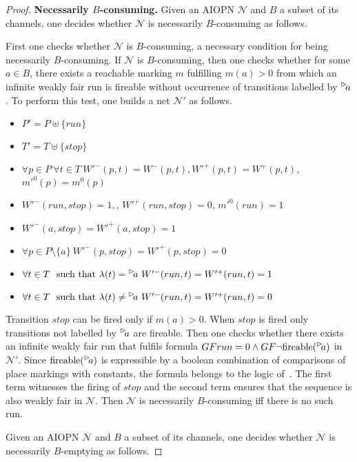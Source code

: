 \begin{proof}
	{\bf Necessarily $B$-consuming.}
Given an AIOPN $\mathcal N$ and $B$ a subset of its channels, one
decides whether $\mathcal N$ is necessarily $B$-consuming as follows.

\noindent First one checks whether $\mathcal N$ is $B$-consuming,
a necessary condition for being necessarily $B$-consuming. 
If $\mathcal N$ is $B$-consuming, then one checks whether
for some $a \in B$, there exists a reachable marking $m$ fulfilling $m(a)>0$ from which an infinite
weakly fair run is fireable without occurrence of transitions labelled by $\inact{a}$. To perform
this test, one builds a net $\mathcal N'$ as follows.

\begin{itemize}
%
	\item $P'=P\uplus \{run\}$
%
	\item $T'=T\uplus \{stop\}$ 
%
	\item $\forall p \in P\ \forall t \in T\ W'^-(p,t)=W^-(p,t), W'^+(p,t)=W^+(p,t)$, $m'^0(p)=m^0(p)$
%
	\item $W'^-(run,stop)=1,$, $W'^+(run,stop)=0$, $m'^0(run)=1$
%
	\item $W'^-(a,stop)=W'^+(a,stop)=1$
%
	\item $\forall p \in P\setminus \{a\}\  W'^-(p,stop)=W'^+(p,stop)=0$
%
	\item $\forall t \in T\ \mbox{ such that }\lambda(t)=\inact{a}\ W'^-(run,t)=W'^+(run,t)=1$
%
	\item $\forall t \in T\ \mbox{ such that }\lambda(t)\neq\inact{a}\ W'^-(run,t)=W'^+(run,t)=0$
%
\end{itemize}

Transition $stop$ can be fired only if $m(a)>0$.
When $stop$ is fired only transitions not labelled by $\inact{a}$ are fireable.
Then one checks whether there exists an infinite weakly fair run 
that fulfils formula $GF run=0 \wedge GF \neg \mbox{fireable}(\inact{a})$
in $\mathcal N'$. Since $\mbox{fireable}(\inact{a})$ is expressible
by a boolean combination of comparisons of place markings with constants,
the formula belongs to the logic of~\cite{Jancar90}.
The first term witnesses the firing of $stop$
and the second term ensures that the sequence is also weakly
fair in $\mathcal N$. Then $\mathcal N$ is necessarily $B$-consuming 
iff there is no such run. 

\smallskip{}
Given an AIOPN $\mathcal N$ and $B$ a subset of its channels, one
decides whether $\mathcal N$ is necessarily $B$-emptying as follows.


\end{proof}
